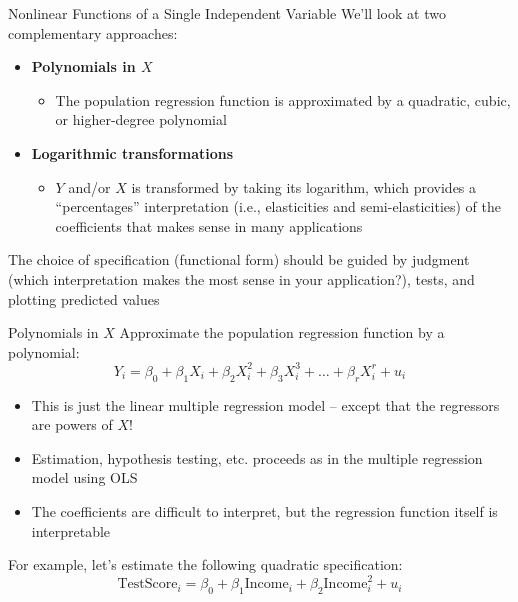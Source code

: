 \documentclass[notes,10pt, aspectratio=169]{beamer}
\begin{document}
\begin{frame}{Nonlinear Functions of a Single Independent Variable}
We’ll look at two complementary approaches:\\[1em]

\begin{itemize}
    \item \textbf{Polynomials in $X$}
    \begin{itemize}
        \item The population regression function is approximated by a quadratic, cubic, or higher-degree polynomial
    \end{itemize}
    \vspace{1em}
    \item \textbf{Logarithmic transformations}
    \begin{itemize}
        \item $Y$ and/or $X$ is transformed by taking its logarithm, which provides a ``percentages'' interpretation (i.e., elasticities and semi-elasticities) of the coefficients that makes sense in many applications
    \end{itemize}
\end{itemize}
\vspace{1em}
The choice of specification (functional form) should be guided by judgment (which interpretation makes the most sense in your application?), tests, and plotting predicted values
\end{frame}


\begin{frame}{Polynomials in $X$}
Approximate the population regression function by a polynomial:
\begin{equation*}
    Y_i = \beta_0 + \beta_1 X_i + \beta_2 X_i^2 + \beta_3 X_i^3 + \dots + \beta_r X_i^r + u_i
\end{equation*}
\begin{itemize}
    \item This is just the linear multiple regression model -- except that the regressors are powers of $X$!
    \item  Estimation, hypothesis testing, etc. proceeds as in the multiple regression model using OLS
    \item The coefficients are difficult to interpret, but the regression function itself is interpretable
\end{itemize}
\vspace{1em}

For example, let's estimate the following quadratic specification:
\begin{equation*}
    \text{TestScore}_i = \beta_0 + \beta_1 \text{Income}_i + \beta_2 \text{Income}_i^2  + u_i
\end{equation*}
\end{frame}
\end{document}

